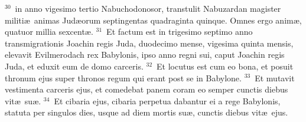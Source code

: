 ${}^{30}$~in anno vigesimo tertio Nabuchodonosor, transtulit Nabuzardan magister militi\ae\ animas Jud\ae orum septingentas quadraginta quinque. Omnes ergo anim\ae , quatuor millia sexcent\ae .
${}^{31}$~Et factum est in trigesimo septimo anno transmigrationis Joachin regis Juda, duodecimo mense, vigesima quinta mensis, elevavit Evilmerodach rex Babylonis, ipso anno regni sui, caput Joachin regis Juda, et eduxit eum de domo carceris.
${}^{32}$~Et locutus est cum eo bona, et posuit thronum ejus super thronos regum qui erant post se in Babylone.
${}^{33}$~Et mutavit vestimenta carceris ejus, et comedebat panem coram eo semper cunctis diebus vit\ae\ su\ae .
${}^{34}$~Et cibaria ejus, cibaria perpetua dabantur ei a rege Babylonis, statuta per singulos dies, usque ad diem mortis su\ae , cunctis diebus vit\ae\ ejus.
